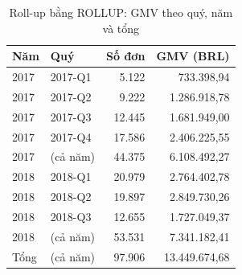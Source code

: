 \begin{table}[htbp]
\centering\small
\caption{Roll-up bằng ROLLUP: GMV theo quý, năm và tổng}
\label{tab:olap-rollup}
\begin{tabular}{llrr}
\toprule
\textbf{Năm} & \textbf{Quý} & \textbf{Số đơn} & \textbf{GMV (BRL)} \\
\midrule
2017 & 2017-Q1 & 5.122 & 733.398,94 \\
2017 & 2017-Q2 & 9.222 & 1.286.918,78 \\
2017 & 2017-Q3 & 12.445 & 1.681.949,00 \\
2017 & 2017-Q4 & 17.586 & 2.406.225,55 \\
2017 & (cả năm) & 44.375 & 6.108.492,27 \\
2018 & 2018-Q1 & 20.979 & 2.764.402,78 \\
2018 & 2018-Q2 & 19.897 & 2.849.730,26 \\
2018 & 2018-Q3 & 12.655 & 1.727.049,37 \\
2018 & (cả năm) & 53.531 & 7.341.182,41 \\
Tổng & (cả năm) & 97.906 & 13.449.674,68 \\
\bottomrule
\end{tabular}
\end{table}
